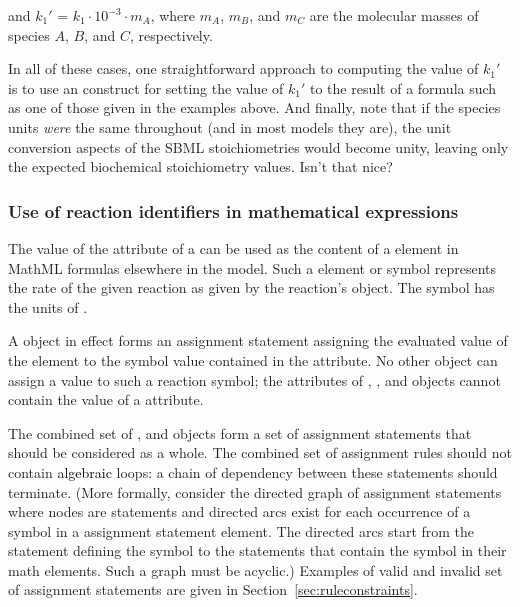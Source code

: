 and ${k_1}'$ = $k_1 \cdot 10^{-3} \cdot m_A$, where $m_A$, $m_B$,
and $m_C$ are the molecular masses of species $A$, $B$, and $C$,
respectively.

In all of these cases, one straightforward approach to computing
the value of ${k_1}'$ is to use an \InitialAssignment construct
for setting the value of ${k_1}'$ to the result of a formula such
as one of those given in the examples above.  And finally, note
that if the species units \emph{were} the same throughout (and in
most models they are), the unit conversion aspects of the SBML
stoichiometries would become unity, leaving only the expected
biochemical stoichiometry values.  Isn't that nice?


\subsubsection{Use of reaction identifiers in mathematical expressions}
\label{subsec:reaction-as-symbol}

The value of the  attribute of a \Reaction can be
used as the content of a  element in MathML formulas
elsewhere in the model. Such a  element or symbol
represents the rate of the given reaction as given by the
reaction's \KineticLaw object.  The symbol has the units
of .

A \KineticLaw object in effect forms an assignment statement
assigning the evaluated value of the  element to the
symbol value contained in the \Reaction {} attribute.  No
other object can assign a value to such a reaction symbol; \ie
the  attributes of \InitialAssignment, \RateRule,
\AssignmentRule and \EventAssignment objects cannot contain the
value of a \Reaction {} attribute.

\clearpage

The combined set of \InitialAssignment, \AssignmentRule and
\KineticLaw objects form a set of assignment statements that
should be considered as a whole.  The combined set of assignment
rules should not contain \textcolor{black}{algebraic} loops: a chain of dependency
between these statements should terminate.  (More formally,
consider the directed graph of assignment statements where nodes
are statements and directed arcs exist for each occurrence of a
symbol in a assignment statement  element. The directed
arcs start from the statement defining the symbol to the
statements that contain the symbol in their math elements. Such a
graph must be acyclic.)  Examples of valid and invalid set of
assignment statements are given in
Section~\ref{sec:ruleconstraints}.


